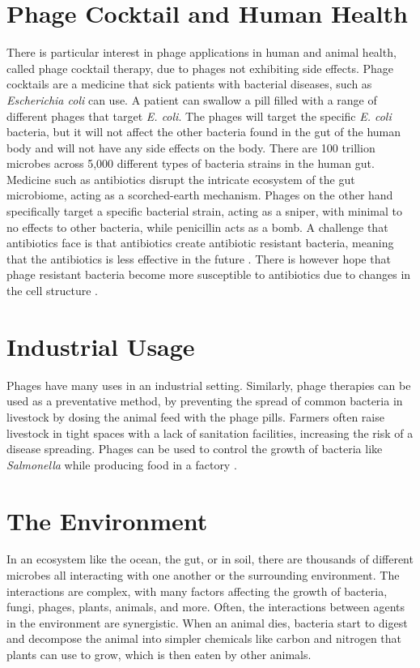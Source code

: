 \section{Phage Cocktail and Human Health}
There is particular interest in phage applications in human and animal health, called phage cocktail therapy, due to phages not exhibiting side effects.
Phage cocktails are a medicine that sick patients with bacterial diseases, such as \textit{Escherichia coli} can use. 
A patient can swallow a pill filled with a range of different phages that target \textit{E. coli}.
The phages will target the specific \textit{E. coli} bacteria, but it will not affect the other bacteria found in the gut of the human body and will not have any side effects on the body. 
There are 100 trillion microbes across 5,000 different types of bacteria strains in the human gut. 
Medicine such as antibiotics disrupt the intricate ecosystem of the gut microbiome, acting as a scorched-earth mechanism. 
Phages on the other hand specifically target a specific bacterial strain, acting as a sniper, with minimal to no effects to other bacteria, while penicillin acts as a bomb. 
A challenge that antibiotics face is that antibiotics create antibiotic resistant bacteria, meaning that the antibiotics is less effective in the future \cite{odonkorBacteriaResistanceAntibiotics2011, volkovaEffectsEarlylifePenicillin2021}. 
There is however hope that phage resistant bacteria become more susceptible to antibiotics due to changes in the cell structure \cite{laurePhageResistancemediatedTradeoffs2022, zhaoPhagedrivenCoevolutionReveals2024}. 

\section{Industrial Usage}
Phages have many uses in an industrial setting. 
Similarly, phage therapies can be used as a preventative method, by preventing the spread of common bacteria in livestock by dosing the animal feed with the phage pills. 
Farmers often raise livestock in tight spaces with a lack of sanitation facilities, increasing the risk of a disease spreading. \newline 
Phages can be used to control the growth of bacteria like \textit{Salmonella} while producing food in a factory \cite{sofferBacteriophagesSafelyReduce2016, kowalskaFreshVegetablesFruit2023}. 

\section{The Environment}
In an ecosystem like the ocean, the gut, or in soil, there are thousands of different microbes all interacting with one another or the surrounding environment.
The interactions are complex, with many factors affecting the growth of bacteria, fungi, phages, plants, animals, and more. 
Often, the interactions between agents in the environment are synergistic. 
When an animal dies, bacteria start to digest and decompose the animal into simpler chemicals like carbon and nitrogen that plants can use to grow, which is then eaten by other animals. \newline 

